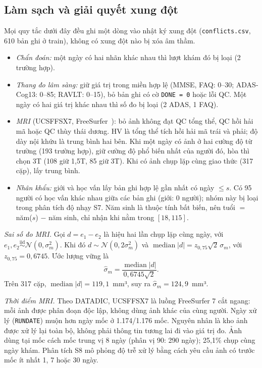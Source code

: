 \documentclass[journal]{IEEEtran}
\newcommand{\code}[1]{\texttt{#1}}
\begin{document}
\subsection{Làm sạch và giải quyết xung đột}
Mọi quy tắc dưới đây đều ghi một dòng vào nhật ký xung đột (\code{conflicts.csv}, 610 bản ghi ở train), không có xung đột nào bị xóa âm thầm.
\begin{itemize}
\item \emph{Chẩn đoán:} một ngày có hai nhãn khác nhau thì lượt khám đó bị loại (2 trường hợp).
\item \emph{Thang đo lâm sàng:} giữ giá trị trong miền hợp lệ (MMSE, FAQ: 0--30; ADAS-Cog13: 0--85; RAVLT: 0--15), bỏ bản ghi có cờ \code{DONE = 0} hoặc lỗi QC. Một ngày có hai giá trị khác nhau thì số đo bị loại (2 ADAS, 1 FAQ).
\item \emph{MRI} (UCSFFSX7, FreeSurfer~\cite{fischl2012}): bỏ ảnh không đạt QC tổng thể, QC hồi hải mã hoặc QC thùy thái dương. HV là tổng thể tích hồi hải mã trái và phải; độ dày nội khứu là trung bình hai bên. Khi một ngày có ảnh ở hai cường độ từ trường (193 trường hợp), giữ cường độ phổ biến nhất của người đó, hòa thì chọn 3T (108 giữ 1,5T, 85 giữ 3T). Khi có ảnh chụp lặp cùng giao thức (317 cặp), lấy trung bình.
\item \emph{Nhân khẩu:} giới và học vấn lấy bản ghi hợp lệ gần nhất có ngày $\le s$. Có 95 người có học vấn khác nhau giữa các bản ghi (giới: 0 người); nhóm này bị loại trong phân tích độ nhạy S7. Năm sinh là thuộc tính bất biến, nên tuổi $=$ năm($s$) $-$ năm sinh, chỉ nhận khi nằm trong $[18,115]$.
\end{itemize}

\emph{Sai số đo MRI.} Gọi $d=e_1-e_2$ là hiệu hai lần chụp lặp cùng ngày, với $e_1,e_2\stackrel{\text{iid}}{\sim}\mathcal N(0,\sigma_m^2)$. Khi đó $d\sim\mathcal N(0,2\sigma_m^2)$ và $\operatorname{median}|d| = z_{0,75}\sqrt2\,\sigma_m$, với $z_{0,75}=0{,}6745$. Ước lượng vững là
\begin{equation}\label{eq:sigma}
\hat\sigma_m = \frac{\operatorname{median}|d|}{0{,}6745\sqrt2}.
\end{equation}
Trên 317 cặp, $\operatorname{median}|d| = 119{,}1$~mm³, suy ra $\hat\sigma_m=124{,}9$~mm³.

\emph{Thời điểm MRI.} Theo DATADIC, UCSFFSX7 là luồng FreeSurfer 7 cắt ngang: mỗi ảnh được phân đoạn độc lập, không dùng ảnh khác của cùng người. Ngày xử lý (\code{RUNDATE}) muộn hơn ngày mốc ở 1.174/1.176 mốc. Nguyên nhân là kho ảnh được xử lý lại toàn bộ, không phải thông tin tương lai đi vào giá trị đo. Ảnh dùng tại mốc cách mốc trung vị 8 ngày (phân vị 90: 290 ngày); 25,1\% chụp cùng ngày khám. Phân tích S8 mô phỏng độ trễ xử lý bằng cách yêu cầu ảnh có trước mốc ít nhất 1, 7 hoặc 30 ngày.
\end{document}
